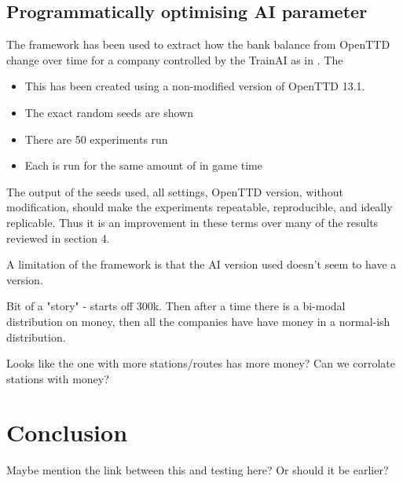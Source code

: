 \documentclass[logo,msc,dsti]{infthesis}    %
\begin{document}



\section{Programmatically optimising AI parameter}

The framework has been used to extract how the bank balance from OpenTTD change over time for a company controlled by the TrainAI as in \label{fig:value-over-time}. The 

\begin{itemize}
  \item This has been created using a non-modified version of OpenTTD 13.1.
  \item The exact random seeds are shown
  \item There are 50 experiments run
  \item Each is run for the same amount of in game time
\end{itemize}

The output of the seeds used, all settings, OpenTTD version, without modification, should make the experiments repeatable, reproducible, and ideally replicable. Thus it is an improvement in these terms over many of the results reviewed in section 4.

A limitation of the framework is that the AI version used doesn't seem to have a version.



Bit of a "story" - starts off 300k. Then after a time there is a bi-modal distribution on money, then all the companies have have money in a normal-ish distribution.

Looks like the one with more stations/routes has more money? Can we corrolate stations with money?










\chapter{Conclusion}

\begin{itemize}
\begin{item}
Maybe mention the link between this and testing here? Or should it be earlier?
\end{item}
\end{itemize}
\end{document}
